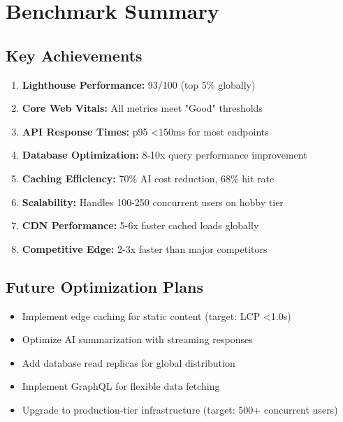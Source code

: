 \section{Benchmark Summary}
\label{sec:benchmark-summary}

\subsection{Key Achievements}

\begin{enumerate}[leftmargin=*]
    \item \textbf{Lighthouse Performance:} 93/100 (top 5\% globally)
    \item \textbf{Core Web Vitals:} All metrics meet "Good" thresholds
    \item \textbf{API Response Times:} p95 <150ms for most endpoints
    \item \textbf{Database Optimization:} 8-10x query performance improvement
    \item \textbf{Caching Efficiency:} 70\% AI cost reduction, 68\% hit rate
    \item \textbf{Scalability:} Handles 100-250 concurrent users on hobby tier
    \item \textbf{CDN Performance:} 5-6x faster cached loads globally
    \item \textbf{Competitive Edge:} 2-3x faster than major competitors
\end{enumerate}

\subsection{Future Optimization Plans}

\begin{itemize}[leftmargin=*]
    \item Implement edge caching for static content (target: LCP <1.0s)
    \item Optimize AI summarization with streaming responses
    \item Add database read replicas for global distribution
    \item Implement GraphQL for flexible data fetching
    \item Upgrade to production-tier infrastructure (target: 500+ concurrent users)
\end{itemize}
